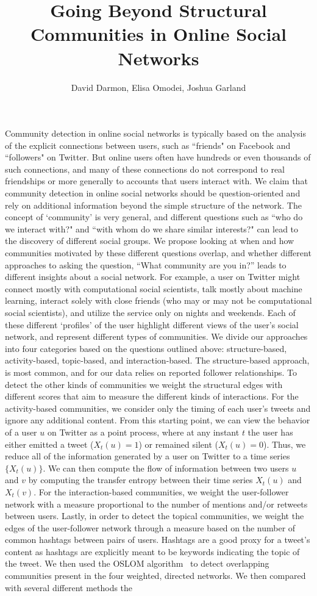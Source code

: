 \documentclass[10pt,a4paper]{article}
\title{Going Beyond Structural Communities in Online Social Networks}
\author{David Darmon, Elisa Omodei, Joshua Garland}
\date{}
\begin{document}
\maketitle

Community detection in online social networks is typically based on the analysis of the explicit connections between users, such as ``friends" on Facebook and ``followers" on Twitter. But online users often have hundreds or even thousands of such connections, and many of these connections do not correspond to real friendships or more generally to accounts that users interact with. We claim that community detection in online social networks should be question-oriented and rely on additional information beyond the simple structure of the network. The concept of `community' is very general, and different questions such as ``who do we interact with?" and ``with whom do we share similar interests?" can lead to the discovery of different social groups. We propose looking at when and how communities motivated by these different questions overlap, and whether different approaches to asking the question, ``What community are you in?'' leads to different insights about a social network. For example, a user on Twitter might connect mostly with computational social scientists, talk mostly about machine learning, interact solely with close friends (who may or may not be computational social scientists), and utilize the service only on nights and weekends. Each of these different `profiles' of the user highlight different views of the user's social network, and represent different types of communities. We divide our approaches into four categories based on the questions outlined above: structure-based, activity-based, topic-based, and interaction-based. The structure-based approach, is most common, and for our data relies on reported follower relationships. To detect the other kinds of communities we weight the structural edges with different scores that aim to measure the different kinds of interactions. For the activity-based communities, we consider only the timing of each user's tweets and ignore any additional content. From this starting point, we can view the behavior of a user $u$ on Twitter as a point process, where at any instant $t$ the user has either emitted a tweet ($X_{t}(u) = 1$) or remained silent ($X_{t}(u) = 0$). Thus, we reduce all of the information generated by a user on Twitter to a time series $\{ X_{t}(u)\}$. We can then compute the flow of information between two users $u$ and $v$ by computing the transfer entropy between their time series $X_{t}(u)$ and $X_{t}(v).$ For the interaction-based communities, we weight the user-follower network with a measure proportional to the number of mentions and/or retweets between users. Lastly, in order to detect the topical communities, we weight the edges of the user-follower network through a measure based on the number of common hashtags between pairs of users. Hashtags are a good proxy for a tweet's content as hashtags are explicitly meant to be keywords indicating the topic of the tweet. We then used the OSLOM algorithm~\cite{LancichinettiPlos} to detect overlapping communities present in the four weighted, directed networks. We then compared with several different methods the 
\end{document}

